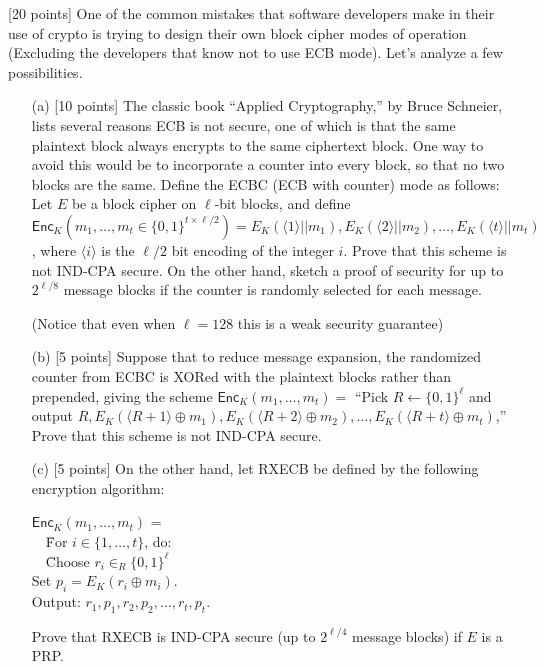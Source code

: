 \documentclass[11pt]{article}
\newcounter{qnum}
\newcommand{\question}[1]{\stepcounter{qnum}\bigskip\noindent{\bf \arabic{qnum}. #1.}}
\newcommand{\enc}{\textsf{Enc}}
\begin{document}
\question{Block Cipher Modes} [20 points]  One of the common mistakes
that software developers make in their use of crypto is trying to
design their own block cipher modes of operation (Excluding the
developers that know not to use ECB mode).  Let's analyze a few
possibilities. 
\begin{itemize}
\item[(a)] [10 points] The classic book ``Applied Cryptography,'' by
  Bruce Schneier, lists several reasons ECB is not secure, one of
  which is that the same plaintext block always encrypts to the same
  ciphertext block.  One way to avoid this would be to incorporate a
  counter into every block, so that no two blocks are the same.
  Define the ECBC (ECB with counter) mode as follows:  Let $E$ be a
  block cipher on $\ell$-bit blocks, and define $\enc_K(m_1,\dots,m_t
  \in \{0,1\}^{t \times\ell/2}) = E_K(\langle 1 \rangle||m_1),
  E_K(\langle 2\rangle||m_2),\dots,E_K(\langle t\rangle||m_t)$, where
  $\langle i \rangle$ is the $\ell/2$ bit encoding of the integer
  $i$.  Prove that this scheme is not IND-CPA secure.  On the other
  hand, sketch a proof of security for up to $2^{\ell/8}$ message
  blocks if the counter is randomly selected for each message.

  (Notice that even when $\ell=128$ this is a weak security guarantee)

\item[(b)] [5 points]  Suppose that to reduce message expansion, the
  randomized counter from ECBC is XORed with the plaintext blocks
  rather than prepended, giving the scheme $\enc_K(m_1,\dots,m_t) =$
  ``Pick $R \leftarrow \{0,1\}^\ell$ and output $R,
  E_K(\langle R+1 \rangle \oplus m_1), E_K(\langle R+2\rangle \oplus
  m_2 ), \dots, E_K(\langle R+t \rangle \oplus m_t)$,''  Prove that
  this scheme is not IND-CPA secure.

\item[(c)] [5 points] On the other hand, let RXECB be defined by the
  following encryption algorithm:
\begin{tabbing}
$\enc_K(m_1,\dots,m_t)$ =\\
\ \ \=For $i \in \{1,\dots,t\}$, do:\\
\>\ \ \=Choose $r_i \in_R \{0,1\}^\ell$ \\
\>\> Set $p_i = E_K(r_i \oplus m_i)$.\\
Output: $r_1,p_1,r_2,p_2,\dots,r_t,p_t$.
\end{tabbing}
Prove that RXECB is IND-CPA secure (up to $2^{\ell/4}$ message blocks)
if $E$ is a PRP.


\end{itemize}
\end{document}
